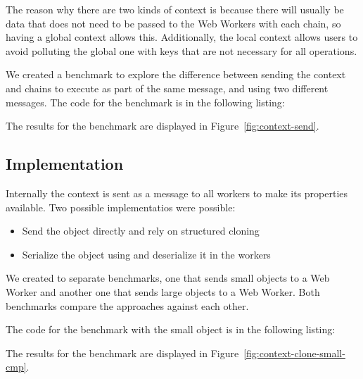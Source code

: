 
The reason why there are two kinds of context is because there will usually be data that does not need to be passed to the Web Workers with each chain, so having a global context allows this. Additionally, the local context allows users to avoid polluting the global one with keys that are not necessary for all operations.

We created a benchmark to explore the difference between sending the context and chains to execute as part of the same message, and using two different messages. The code for the benchmark is in the following listing:

The results for the benchmark are displayed in Figure~\ref{fig:context-send}.

\subsection{Implementation}
Internally the context is sent as a message to all workers to make its properties available. Two possible implementatios were possible:
\begin{itemize}
  \item Send the object directly and rely on structured cloning
  \item Serialize the object using  and deserialize it in the workers
\end{itemize}


We created to separate benchmarks, one that sends small objects to a Web Worker and another one that sends large objects to a Web Worker. Both benchmarks compare the approaches against each other.

The code for the benchmark with the small object is in the following listing:

The results for the benchmark are displayed in Figure~\ref{fig:context-clone-small-cmp}.

